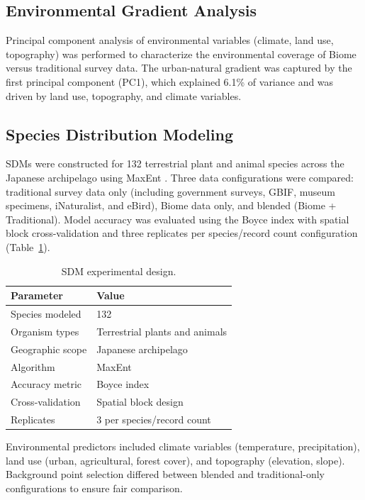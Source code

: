 \documentclass[11pt]{article}
\begin{document}
\subsection{Environmental Gradient Analysis}

Principal component analysis of environmental variables (climate, land use, topography) was performed to characterize the environmental coverage of Biome versus traditional survey data. The urban-natural gradient was captured by the first principal component (PC1), which explained 6.1\% of variance and was driven by land use, topography, and climate variables.

\subsection{Species Distribution Modeling}

SDMs were constructed for 132 terrestrial plant and animal species across the Japanese archipelago using MaxEnt \citep{phillips2006maximum}. Three data configurations were compared: traditional survey data only (including government surveys, GBIF, museum specimens, iNaturalist, and eBird), Biome data only, and blended (Biome + Traditional). Model accuracy was evaluated using the Boyce index with spatial block cross-validation and three replicates per species/record count configuration (Table~\ref{tab:sdm}).

\begin{table}[htbp]
\centering
\caption{SDM experimental design.}
\label{tab:sdm}
\begin{tabular}{ll}
\toprule
Parameter & Value \\
\midrule
Species modeled & 132 \\
Organism types & Terrestrial plants and animals \\
Geographic scope & Japanese archipelago \\
Algorithm & MaxEnt \\
Accuracy metric & Boyce index \\
Cross-validation & Spatial block design \\
Replicates & 3 per species/record count \\
\bottomrule
\end{tabular}
\end{table}

Environmental predictors included climate variables (temperature, precipitation), land use (urban, agricultural, forest cover), and topography (elevation, slope). Background point selection differed between blended and traditional-only configurations to ensure fair comparison.
\end{document}
